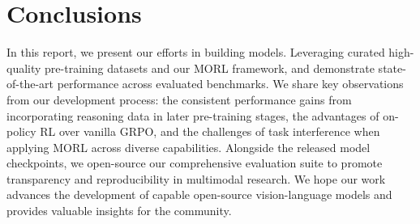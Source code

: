 \section{Conclusions}
In this report, we present our efforts in building \mimovl{} models.
Leveraging curated high-quality pre-training datasets and our MORL framework, \mimovlsft{} and \mimovlrl{} demonstrate state-of-the-art performance across evaluated benchmarks. 
We share key observations from our development process: the consistent performance gains from incorporating reasoning data in later pre-training stages, the advantages of on-policy RL over vanilla GRPO, and the challenges of task interference when applying MORL across diverse capabilities.
Alongside the released model checkpoints, we open-source our comprehensive evaluation suite to promote transparency and reproducibility in multimodal research. 
We hope our work advances the development of capable open-source vision-language models and provides valuable insights for the community.

